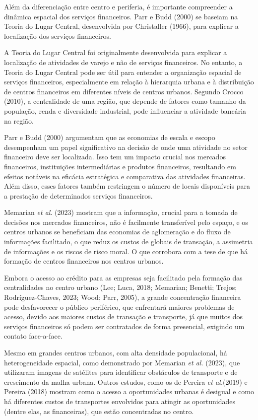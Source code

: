 \documentclass[a4paper,12pt]{article}
\begin{document}
Além da diferenciação entre centro e periferia, é importante compreender
a dinâmica espacial dos serviços financeiros. Parr e Budd (2000) se
baseiam na Teoria do Lugar Central, desenvolvida por Christaller (1966),
para explicar a localização dos serviços financeiros.

A Teoria do Lugar Central foi originalmente desenvolvida para explicar a
localização de atividades de varejo e não de serviços financeiros. No
entanto, a Teoria do Lugar Central pode ser útil para entender a
organização espacial de serviços financeiros, especialmente em relação à
hierarquia urbana e à distribuição de centros financeiros em diferentes
níveis de centros urbanos. Segundo Crocco (2010), a centralidade de uma
região, que depende de fatores como tamanho da população, renda e
diversidade industrial, pode influenciar a atividade bancária na região.

Parr e Budd (2000) argumentam que as economias de escala e escopo
desempenham um papel significativo na decisão de onde uma atividade no
setor financeiro deve ser localizada. Isso tem um impacto crucial nos
mercados financeiros, instituições intermediárias e produtos
financeiros, resultando em efeitos notáveis na eficácia estratégica e
comparativa das atividades financeiras. Além disso, esses fatores também
restringem o número de locais disponíveis para a prestação de
determinados serviços financeiros.

Memarian \emph{et al}. (2023) mostram que a informação, crucial para a
tomada de decisões nos mercados financeiros, não é facilmente
transferível pelo espaço, e os centros urbanos se beneficiam das
economias de aglomeração e do fluxo de informações facilitado, o que
reduz os custos de globais de transação, a assimetria de informações e
os riscos de risco moral. O que corrobora com a tese de que há formação
de centros financeiros nos centros urbanos.

Embora o acesso ao crédito para as empresas seja facilitado pela
formação das centralidades no centro urbano (Lee; Luca, 2018; Memarian;
Benetti; Trejos; Rodríguez-Chaves, 2023; Wood; Parr, 2005), a grande
concentração financeira pode desfavorecer o público periférico, que
enfrentará maiores problemas de acesso, devido aos maiores custos de
transação e transporte, já que muitos dos serviços financeiros só podem
ser contratados de forma presencial, exigindo um contato face-a-face.

Mesmo em grandes centros urbanos, com alta densidade populacional, há
heterogeneidade espacial, como demonstrado por Memarian \emph{et al.}
(2023), que utilizaram imagens de satélites para identificar obstáculos
de transporte e de crescimento da malha urbana. Outros estudos, como os
de Pereira \emph{et al.}(2019) e Pereira (2018) mostram como o acesso a
oportunidades urbanas é desigual e como há diferentes custos de
transportes envolvidos para atingir as oportunidades (dentre elas, as
financeiras), que estão concentradas no centro.
\end{document}
